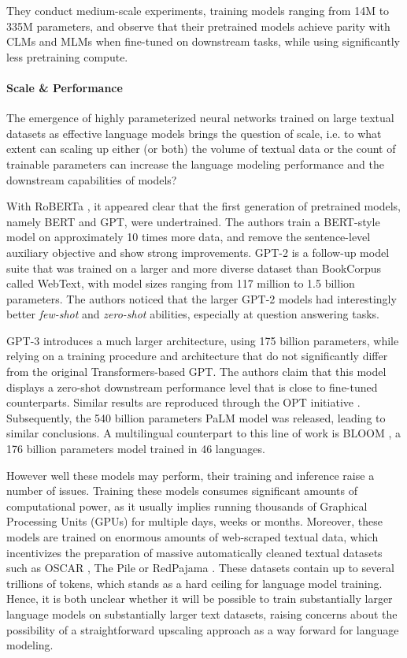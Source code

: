 They conduct medium-scale experiments, training models ranging from 14M to 335M parameters, and observe that their pretrained models achieve parity with CLMs and MLMs when fine-tuned on downstream tasks, while using significantly less pretraining compute.


\paragraph*{Scale \& Performance}
The emergence of highly parameterized neural networks trained on large textual datasets as effective language models brings the question of scale, i.e. to what extent can scaling up either (or both) the volume of textual data or the count of trainable parameters can increase the language modeling performance and the downstream capabilities of models?

With RoBERTa \citep{roberta}, it appeared clear that the first generation of pretrained models, namely BERT and GPT, were undertrained. The authors train a BERT-style model on approximately 10 times more data, and remove the sentence-level auxiliary objective and show strong improvements. GPT-2 \citep{gpt2} is a follow-up model suite that was trained on a larger and more diverse dataset than BookCorpus called WebText, with model sizes ranging from 117 million to 1.5 billion parameters. The authors noticed that the larger GPT-2 models had interestingly better \textit{few-shot} and \textit{zero-shot} abilities, especially at question answering tasks.

GPT-3 \citep{gpt3} introduces a much larger architecture, using 175 billion parameters, while relying on a training procedure and architecture that do not significantly differ from the original Transformers-based GPT. The authors claim that this model displays a zero-shot downstream performance level that is close to fine-tuned counterparts. Similar results are reproduced through the OPT initiative \citep{zhang2022opt}. Subsequently, the 540 billion parameters PaLM model \citep{palm} was released, leading to similar conclusions. A multilingual counterpart to this line of work is BLOOM \citep{le2023bloom}, a 176 billion parameters model trained in 46 languages.

However well these models may perform, their training and inference raise a number of issues. Training these models consumes significant amounts of computational power, as it usually implies running thousands of Graphical Processing Units (GPUs) for multiple days, weeks or months. Moreover, these models are trained on enormous amounts of web-scraped textual data, which incentivizes the preparation of massive automatically cleaned textual datasets such as OSCAR \citep{oscar}, The Pile \citep{gao2020pile} or RedPajama \citep{together2023redpajama}. These datasets contain up to several trillions of tokens, which stands as a hard ceiling for language model training. Hence, it is both unclear whether it will be possible to train substantially larger language models on substantially larger text datasets, raising concerns about the possibility of a straightforward upscaling approach as a way forward for language modeling.


